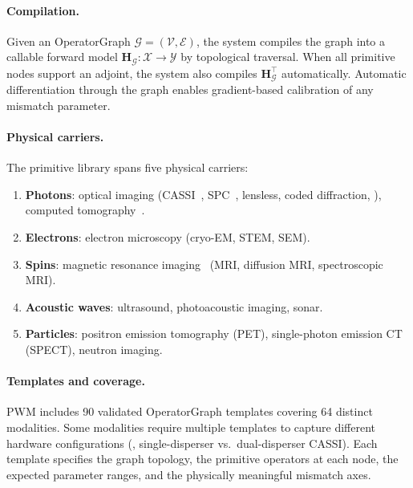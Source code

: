 \paragraph{Compilation.}
Given an OperatorGraph $\mathcal{G} = (\mathcal{V}, \mathcal{E})$, the
system compiles the graph into a callable forward model
$\mathbf{H}_\mathcal{G}: \mathcal{X} \to \mathcal{Y}$ by topological
traversal.
When all primitive nodes support an adjoint, the system also compiles
$\mathbf{H}_\mathcal{G}^\top$ automatically.
Automatic differentiation through the graph enables gradient-based
calibration of any mismatch parameter.

\paragraph{Physical carriers.}
The primitive library spans five physical carriers:
\begin{enumerate}
  \item \textbf{Photons}: optical imaging (CASSI~\cite{wagadarikar2008cassi}, SPC~\cite{duarte2008spc}, lensless,
        coded diffraction, \etc{}), computed tomography~\cite{feldkamp1984practical}.
  \item \textbf{Electrons}: electron microscopy (cryo-EM, STEM, SEM).
  \item \textbf{Spins}: magnetic resonance imaging~\cite{lustig2007sparse}
        (MRI, diffusion MRI, spectroscopic MRI).
  \item \textbf{Acoustic waves}: ultrasound, photoacoustic imaging,
        sonar.
  \item \textbf{Particles}: positron emission tomography (PET),
        single-photon emission CT (SPECT), neutron imaging.
\end{enumerate}

\paragraph{Templates and coverage.}
PWM includes 90 validated OperatorGraph templates covering 64 distinct
modalities.
Some modalities require multiple templates to capture different
hardware configurations (\eg, single-disperser vs.\ dual-disperser
CASSI).
Each template specifies the graph topology, the primitive operators at
each node, the expected parameter ranges, and the physically meaningful
mismatch axes.

